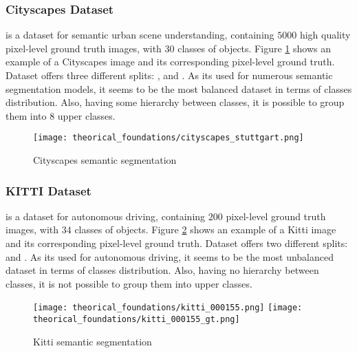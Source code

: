       \subsubsection{Cityscapes Dataset}

         is a dataset for semantic urban scene understanding, containing
        $5000$ high quality pixel-level ground truth images, with $30$ classes of
        objects\cite{cordts2016cityscapes}. Figure \ref{fig:cityscapes_semantic_segmentation}
        shows an example of a Cityscapes image and its corresponding pixel-level ground truth.
        Dataset offers three different splits: ,  and .
        As its used for numerous semantic segmentation models, it seems to be the most
        balanced dataset in terms of classes distribution. Also, having some hierarchy
        between classes, it is possible to group them into $8$ upper classes.

        \begin{figure}[htbp]
          \centering
          \texttt{[image: theorical\_foundations/cityscapes\_stuttgart.png]}
          \caption{Cityscapes semantic segmentation}
          \label{fig:cityscapes_semantic_segmentation}
        \end{figure}

      \subsubsection{KITTI Dataset}

         is a dataset for autonomous driving, containing $200$ pixel-level
        ground truth images, with $34$ classes of objects\cite{Geiger2012CVPR}. Figure
        \ref{fig:kitti_semantic_segmentation} shows an example of a Kitti image and
        its corresponding pixel-level ground truth. Dataset offers two different splits:
         and . As its used for autonomous driving, it seems to be
        the most unbalanced dataset in terms of classes distribution. Also, having no
        hierarchy between classes, it is not possible to group them into upper classes.

        \begin{figure}[htbp]
          \centering
          \texttt{[image: theorical\_foundations/kitti\_000155.png]}
          \texttt{[image: theorical\_foundations/kitti\_000155\_gt.png]}
          \caption{Kitti semantic segmentation}
          \label{fig:kitti_semantic_segmentation}
        \end{figure}

